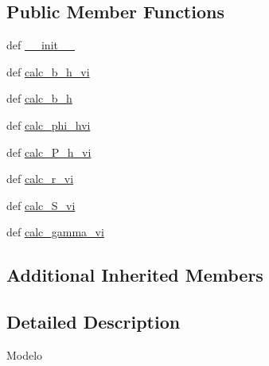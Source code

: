 \subsection*{Public Member Functions}
\begin{DoxyCompactItemize}
\item 
def \hyperlink{class_models_1_1_g0s_rcon_1_1_model_a75577cbd55530984550f172e80875b8e}{\-\_\-\-\_\-init\-\_\-\-\_\-}
\item 
def \hyperlink{class_models_1_1_g0s_rcon_1_1_model_a6efae20699b0011357265ea89c81fba3}{calc\-\_\-b\-\_\-h\-\_\-vi}
\item 
def \hyperlink{class_models_1_1_g0s_rcon_1_1_model_a04ecbecf6f7290a70654271eabd576e4}{calc\-\_\-b\-\_\-h}
\item 
def \hyperlink{class_models_1_1_g0s_rcon_1_1_model_aff984472f5f2fa388212fbc3cc93b3ce}{calc\-\_\-phi\-\_\-hvi}
\item 
def \hyperlink{class_models_1_1_g0s_rcon_1_1_model_abf05f96a51cb09f5a59a6e0d7ad1d62f}{calc\-\_\-\-P\-\_\-h\-\_\-vi}
\item 
def \hyperlink{class_models_1_1_g0s_rcon_1_1_model_ac8288b22f43428b485bae414a5f187f7}{calc\-\_\-r\-\_\-vi}
\item 
def \hyperlink{class_models_1_1_g0s_rcon_1_1_model_ab4d9e1ac6366938dc1ef8e3eabccc039}{calc\-\_\-\-S\-\_\-vi}
\item 
def \hyperlink{class_models_1_1_g0s_rcon_1_1_model_a7d652f6c1837279cb8b2478cf22149dd}{calc\-\_\-gamma\-\_\-vi}
\end{DoxyCompactItemize}
\subsection*{Additional Inherited Members}


\subsection{Detailed Description}
\begin{DoxyVerb}Modelo\end{DoxyVerb}
 

